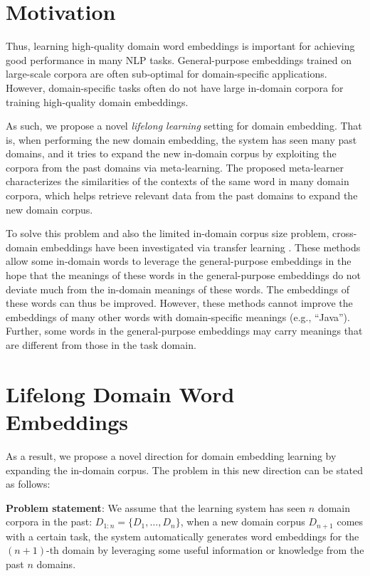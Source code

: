 \section{Motivation}
\label{chap3:sec:intro}

Thus, learning high-quality domain word embeddings is important for achieving good performance in many NLP tasks. General-purpose embeddings trained on large-scale corpora are often sub-optimal for domain-specific applications. However, domain-specific tasks often do not have large in-domain corpora for training high-quality domain embeddings.

As such, we propose a novel \textit{lifelong learning} setting for domain embedding. That is, when performing the new domain embedding, the system has seen many past domains, and it tries to expand the new in-domain corpus by exploiting the corpora from the past domains via meta-learning. The proposed meta-learner characterizes the similarities of the contexts of the same word in many domain corpora, which helps retrieve relevant data from the past domains to expand the new domain corpus. 

To solve this problem and also the limited in-domain corpus size problem, cross-domain embeddings have been investigated \cite{bollegala-maehara-kawarabayashi:2015:ACL-IJCNLP,yang-lu-zheng:2017:EMNLP2017,bollegala2017think} via transfer learning \cite{pan2010survey}.
These methods allow some in-domain words to leverage the general-purpose embeddings in the hope that the meanings of these words in the general-purpose embeddings do not deviate much from the in-domain meanings of these words. The embeddings of these words can thus be improved. However, these methods cannot improve the embeddings of many other words with domain-specific meanings (e.g., ``Java'').
Further, some words in the general-purpose embeddings may carry meanings that are different from those in the task domain. 

\section{Lifelong Domain Word Embeddings}

As a result, we propose a novel direction for domain embedding learning by expanding the in-domain corpus. The problem in this new direction can be stated as follows:

\textbf{Problem statement}: We assume that the learning system has seen $n$ domain corpora in the past: $D_{1:n}=\{D_1, \dots, D_n\}$, when a new domain corpus $D_{n+1}$ comes with a certain task, the system automatically generates word embeddings for the $(n+1)$-th domain by leveraging some useful information or knowledge from the past $n$ domains.

